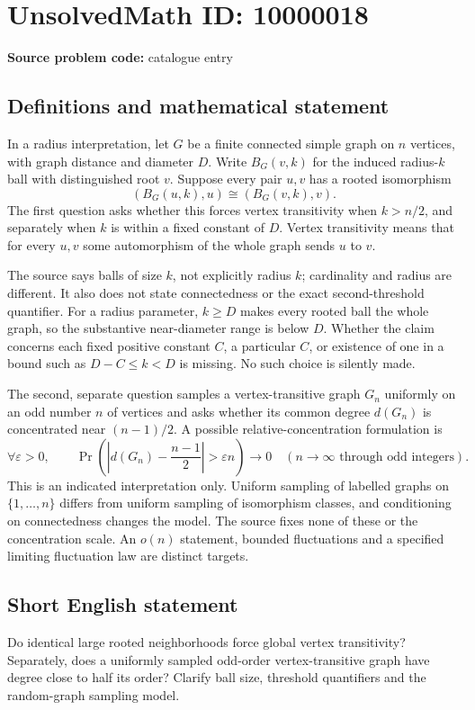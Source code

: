 \documentclass[11pt]{article}
\begin{document}
\section*{UnsolvedMath ID: 10000018}
\textbf{Source problem code:} catalogue entry
\subsection{Definitions and mathematical statement}
In a radius interpretation, let $G$ be a finite connected simple graph on $n$ vertices, with graph distance and diameter $D$. Write $B_G(v,k)$ for the induced radius-$k$ ball with distinguished root $v$. Suppose every pair $u,v$ has a rooted isomorphism
\[
(B_G(u,k),u)\cong(B_G(v,k),v).
\]
The first question asks whether this forces vertex transitivity when $k>n/2$, and separately when $k$ is within a fixed constant of $D$. Vertex transitivity means that for every $u,v$ some automorphism of the whole graph sends $u$ to $v$.

The source says balls of size $k$, not explicitly radius $k$; cardinality and radius are different. It also does not state connectedness or the exact second-threshold quantifier. For a radius parameter, $k\geq D$ makes every rooted ball the whole graph, so the substantive near-diameter range is below $D$. Whether the claim concerns each fixed positive constant $C$, a particular $C$, or existence of one in a bound such as $D-C\leq k<D$ is missing. No such choice is silently made.

The second, separate question samples a vertex-transitive graph $G_n$ uniformly on an odd number $n$ of vertices and asks whether its common degree $d(G_n)$ is concentrated near $(n-1)/2$. A possible relative-concentration formulation is
\[
\forall\varepsilon>0,\qquad
\Pr\left(\left|d(G_n)-\frac{n-1}{2}\right|>\varepsilon n\right)\longrightarrow0
\quad(n\to\infty\text{ through odd integers}).
\]
This is an indicated interpretation only. Uniform sampling of labelled graphs on $\{1,\ldots,n\}$ differs from uniform sampling of isomorphism classes, and conditioning on connectedness changes the model. The source fixes none of these or the concentration scale. An $o(n)$ statement, bounded fluctuations and a specified limiting fluctuation law are distinct targets.
\subsection{Short English statement}
Do identical large rooted neighborhoods force global vertex transitivity? Separately, does a uniformly sampled odd-order vertex-transitive graph have degree close to half its order? Clarify ball size, threshold quantifiers and the random-graph sampling model.
\end{document}
